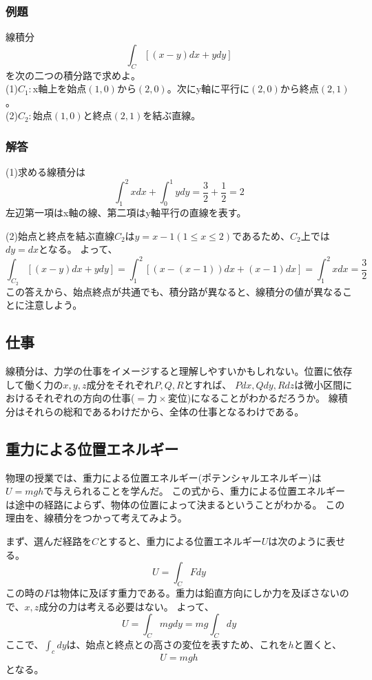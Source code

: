 \documentclass[a4j,dvipdfmx]{jsarticle}
\begin{document}
\subsubsection*{例題}
線積分
\begin{equation*}
    \int_C[(x-y)dx+ydy]
\end{equation*}
を次の二つの積分路で求めよ。\\
(1)$C_1:$x軸上を始点$(1,0)$から$(2,0)$。次にy軸に平行に$(2,0)$から終点$(2,1)$。\\
(2)$C_2:$始点$(1,0)$と終点$(2,1)$を結ぶ直線。

\subsubsection*{解答}
(1)求める線積分は
\begin{equation*}
    \int_1^2 xdx+\int_0^1 ydy=\frac{3}{2}+\frac{1}{2}=2
\end{equation*}
左辺第一項はx軸の線、第二項はy軸平行の直線を表す。

(2)始点と終点を結ぶ直線$C_2$は$y=x-1(1\leq x\leq 2)$であるため、$C_2$上では$dy=dx$となる。
よって、
\begin{equation*}
    \int_{C_2}[(x-y)dx+ydy]=\int_1^2[(x-(x-1))dx+(x-1)dx]=\int_1^2 xdx=\frac{3}{2}
\end{equation*}
この答えから、始点終点が共通でも、積分路が異なると、線積分の値が異なることに注意しよう。

\subsection{仕事}
線積分は、力学の仕事をイメージすると理解しやすいかもしれない。位置に依存して働く力の$x,y,z$成分をそれぞれ$P,Q,R$とすれば、
$Pdx,Qdy,Rdz$は微小区間におけるそれぞれの方向の仕事($=\text{力}\times\text{変位}$)になることがわかるだろうか。
線積分はそれらの総和であるわけだから、全体の仕事となるわけである。
\subsection{重力による位置エネルギー}
物理の授業では、重力による位置エネルギー(ポテンシャルエネルギー)は$U=mgh$で与えられることを学んだ。
この式から、重力による位置エネルギーは途中の経路によらず、物体の位置によって決まるということがわかる。
この理由を、線積分をつかって考えてみよう。

まず、選んだ経路を$C$とすると、重力による位置エネルギー$U$は次のように表せる。
\begin{equation*}
    U=\int_C Fdy
\end{equation*}
この時の$F$は物体に及ぼす重力である。重力は鉛直方向にしか力を及ぼさないので、$x,z$成分の力は考える必要はない。
よって、
\begin{equation*}
    U=\int_C mg dy=mg\int_C dy
\end{equation*}
ここで、$\displaystyle\int_c dy$は、始点と終点との高さの変位を表すため、これを$h$と置くと、
\begin{equation*}
    U=mgh
\end{equation*}
となる。
\newpage
\end{document}
